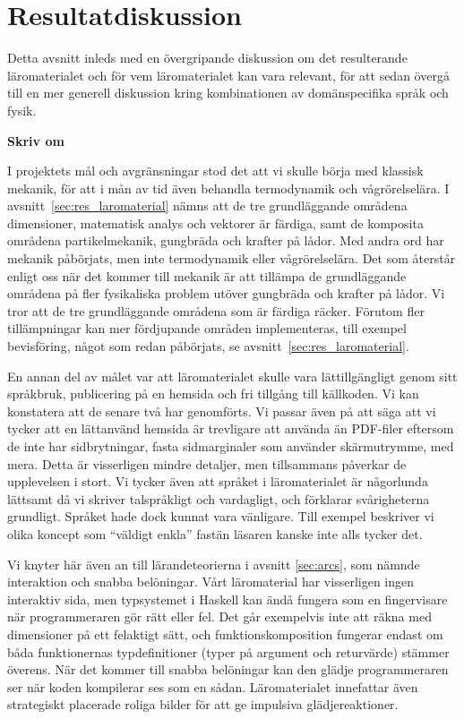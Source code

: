 \section{Resultatdiskussion}\label{sec:res_disk}

Detta avsnitt inleds med en övergripande diskussion om det resulterande
läromaterialet och för vem läromaterialet kan vara relevant, för att sedan
övergå till en mer generell diskussion kring kombinationen av domänspecifika
språk och fysik.

\textbf{Skriv om}

I projektets mål och avgränsningar stod det att vi skulle börja med klassisk
mekanik, för att i mån av tid även behandla termodynamik och vågrörelselära. I avsnitt~\ref{sec:res_laromaterial} nämns att de tre grundläggande
områdena dimensioner, matematisk analys och vektorer är färdiga, samt de
komposita områdena partikelmekanik, gungbräda och krafter på lådor. Med andra
ord har mekanik påbörjats, men inte termodynamik eller vågrörelselära. Det som återstår enligt oss när det kommer till mekanik är att tillämpa de grundläggande områdena på
fler fysikaliska problem utöver gungbräda och krafter på lådor. Vi tror att de
tre grundläggande områdena som är färdiga räcker. Förutom fler tillämpningar kan
mer fördjupande områden implementeras, till exempel bevisföring, något som redan
påbörjats, se avsnitt~\ref{sec:res_laromaterial}.

En annan del av målet var att läromaterialet skulle vara lättillgängligt genom
sitt språkbruk, publicering på en hemsida och fri tillgång till källkoden.
Vi kan konstatera att de senare två har genomförts. Vi passar även på att
säga att vi tycker att en lättanvänd hemsida är trevligare att använda än
PDF-filer eftersom de inte har sidbrytningar, fasta sidmarginaler som använder
skärmutrymme, med mera. Detta är visserligen mindre detaljer, men tillsammans
påverkar de upplevelsen i stort. Vi
tycker även att språket i läromaterialet är någorlunda lättsamt då vi skriver
talspråkligt och vardagligt, och förklarar svårigheterna grundligt. Språket hade
dock kunnat vara vänligare. Till exempel beskriver vi olika koncept som
``väldigt enkla'' fastän läsaren kanske inte alls tycker det.

Vi knyter här även an till lärandeteorierna i avsnitt \ref{sec:arcs}, som nämnde interaktion och snabba belöningar. Vårt läromaterial har visserligen ingen interaktiv sida, men typsystemet i Haskell kan ändå fungera som en fingervisare när programmeraren gör rätt eller fel. Det går exempelvis inte att räkna med dimensioner på ett felaktigt sätt, och funktionskomposition fungerar endast om båda funktionernas typdefinitioner (typer på argument och returvärde) stämmer överens. När det kommer till snabba belöningar kan den glädje programmeraren ser när koden kompilerar ses som en sådan. Läromaterialet innefattar även strategiskt placerade roliga bilder för att ge impulsiva glädjereaktioner.

